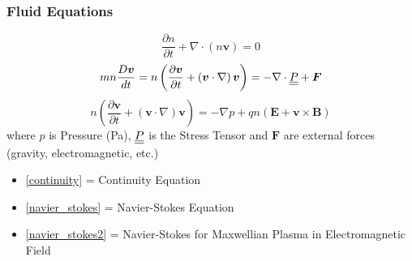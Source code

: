 \subsubsection{Fluid Equations}
\begin{equation}\label{continuity}
	\frac{\partial n}{\partial t} + \nabla \cdot \left(n\bm{v}\right) = 0
\end{equation}
\begin{equation}\label{navier_stokes}
	mn\frac{D\bm{v}}{dt} = n\left(\frac{\partial \bm{v}}{\partial t} + \left(\bm{v} \cdot \nabla\right) \bm{v}\right) = -\nabla \cdot \underline{\underline{P}} + \bm{F}
\end{equation}
\begin{equation}\label{navier_stokes2}
	n\left(\frac{\partial \bm{v}}{\partial t} + \left(\bm{v} \cdot \nabla\right) \bm{v}\right) = -\nabla p + qn\left(\bm{E} + \bm{v} \times \bm{B}\right)
\end{equation}
where $p$ is Pressure (Pa), $\underline{\underline{P}}$ is the Stress Tensor and $\bm{F}$ are external forces (gravity, electromagnetic, etc.)

\begin{itemize}
	\item[] \eqref{continuity} = Continuity Equation
	\item[] \eqref{navier_stokes} = Navier-Stokes Equation
	\item[] \eqref{navier_stokes2} = Navier-Stokes for Maxwellian Plasma in Electromagnetic Field
\end{itemize}

